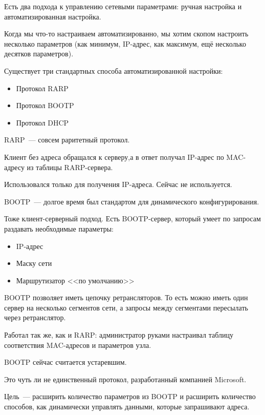 
Есть два подхода к управлению сетевыми параметрами: ручная настройка и автоматизированная настройка. 

Когда мы что-то настраиваем автоматизированно, мы хотим скопом настроить несколько параметров (как минимум, IP-адрес, как максимум, ещё несколько десятков параметров).

Существует три стандартных способа автоматизированной настройки:
\begin{itemize}
    \item Протокол RARP
    \item Протокол BOOTP
    \item Протокол DHCP
\end{itemize}


RARP~--- совсем раритетный протокол.

Клиент без адреса обращался к серверу,а в ответ получал IP-адрес по MAC-адресу из таблицы RARP-сервера.

Использовался только для получения IP-адреса. Сейчас не используется.

BOOTP~--- долгое время был стандартом для динамического конфигурирования.

Тоже клиент-серверный подход. Есть BOOTP-сервер, который умеет по запросам раздавать необходимые параметры:
\begin{itemize}
    \item IP-адрес
    \item Маску сети
    \item Маршрутизатор <<по умолчанию>>
\end{itemize}

BOOTP позволяет иметь цепочку ретрансляторов. То есть можно иметь один сервер на несколько сегментов сети, а запросы между сегментами пересылать через ретранслятор.

Работал так же, как и RARP: администратор руками настраивал таблицу соответствия MAC-адресов и параметров узла.

BOOTP сейчас считается устаревшим.


Это чуть ли не единственный протокол, разработанный компанией Microsoft.

Цель~--- расширить количество параметров из BOOTP и расширить количество способов, как динамически управлять данными, которые запрашивают адреса.

